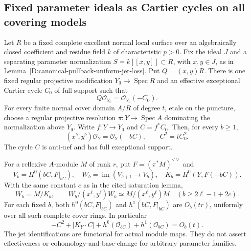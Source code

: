 \subsection{Fixed parameter ideals as Cartier cycles on all covering models}

\begin{proposition}
\label{D:hereditary-Cartier-parameter-jets}
Let $R$ be a fixed complete excellent normal local surface over an
algebraically closed coefficient and residue field $k$ of characteristic
$p>0$. Fix the ideal $J$ and a separating parameter normalization
$S=k[[x,y]]\subset R$, with $x,y\in J$, as in
Lemma~\ref{D:canonical-pullback-uniform-jet-loss}. Put
$Q=(x,y)R$. There is one fixed regular projective modification
$Y_0\to\operatorname{Spec}R$ and an effective exceptional Cartier
cycle $C_0$ of full support such that
\[
                    Q\mathcal O_{Y_0}=\mathcal O_{Y_0}(-C_0).
                                                        \tag{D.HC.1}
\]
For every finite normal cover domain $A/R$ of degree $t$, etale on
the puncture, choose a regular projective resolution $\pi:Y\to
\operatorname{Spec}A$ dominating the normalization above $Y_0$.
Write $f:Y\to Y_0$ and $C=f^*C_0$. Then, for every $b\ge1$,
\[
 (x^b,y^b)\mathcal O_Y=\mathcal O_Y(-bC),\qquad
                    C^2=tC_0^2.                       \tag{D.HC.2}
\]
The cycle $C$ is anti-nef and has full exceptional support.

For a reflexive $A$-module $M$ of rank $r$, put
$F=(\pi^*M)^{\vee\vee}$ and
\[
 V_b=H^0(bC,F|_{bC}),\quad
 W_b=\operatorname{im}(V_{b+1}\longrightarrow V_b),\quad
 K_b=H^0(Y,F(-bC)).
\]
With the same constant $c$ as in the cited saturation lemma,
\[
 W_b=M/K_b,\qquad
 W_b/(x^\ell,y^\ell)W_b\simeq M/(x^\ell,y^\ell)M
                 \quad(b\ge2\ell-1+2c).                \tag{D.HC.3}
\]
For each fixed $b$, both $h^0(bC,F|_{bC})$ and
$h^1(bC,F|_{bC})$ are $O_b(tr)$, uniformly over all such complete
cover rings. In particular
\[
 -C^2+|K_Y\cdot C|+h^0(\mathcal O_{bC})+
                         h^1(\mathcal O_{bC})=O_b(t).  \tag{D.HC.4}
\]
The jet identifications are functorial for actual module maps.
They do not assert effectiveness or cohomology-and-base-change for
arbitrary parameter families.
\end{proposition}

